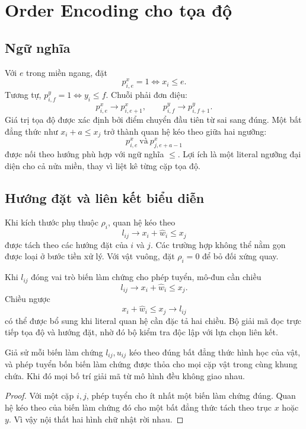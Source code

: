 \section{Order Encoding cho tọa độ}

\subsection{Ngữ nghĩa}

Với \(e\) trong miền ngang, đặt
\[
  p^x_{i,e}=1 \iff x_i\le e.
\]
Tương tự, \(p^y_{i,f}=1\iff y_i\le f\). Chuỗi phải đơn điệu:
\[
  p^x_{i,e}\rightarrow p^x_{i,e+1},
  \qquad
  p^y_{i,f}\rightarrow p^y_{i,f+1}.
\]
Giá trị tọa độ được xác định bởi điểm chuyển đầu tiên từ sai sang đúng. Một
bất đẳng thức như \(x_i+a\le x_j\) trở thành quan hệ kéo theo giữa hai ngưỡng:
\[
  p^x_{i,e}\ \text{và}\ p^x_{j,e+a-1}
\]
được nối theo hướng phù hợp với ngữ nghĩa \(\le\). Lợi ích là một literal
ngưỡng đại diện cho cả nửa miền, thay vì liệt kê từng cặp tọa độ.

\subsection{Hướng đặt và liên kết biểu diễn}

Khi kích thước phụ thuộc \(\rho_i\), quan hệ kéo theo
\[
  l_{ij}\rightarrow x_i+\widehat w_i\le x_j
\]
được tách theo các hướng đặt của \(i\) và \(j\). Các trường hợp không thể nằm
gọn được loại ở bước tiền xử lý. Với vật vuông, đặt
\(\rho_i=0\) để bỏ đối xứng quay.

Khi \(l_{ij}\) đóng vai trò biến làm chứng cho phép tuyển, mô-đun cần chiều
\[
  l_{ij}\rightarrow x_i+\widehat w_i\le x_j.
\]
Chiều ngược
\[
  x_i+\widehat w_i\le x_j\rightarrow l_{ij}
\]
có thể được bổ sung khi literal quan hệ cần đặc tả hai chiều. Bộ giải mã đọc
trực tiếp tọa độ và hướng đặt, nhờ đó bộ kiểm tra độc lập với lựa chọn liên kết.

\begin{proposition}
Giả sử mỗi biến làm chứng \(l_{ij},u_{ij}\) kéo theo đúng bất đẳng thức hình học
của vật, và phép tuyển bốn biến làm chứng được thỏa cho mọi cặp vật trong cùng khung
chứa. Khi đó mọi bố trí giải mã từ mô hình \SAT đều không giao nhau.
\end{proposition}

\begin{proof}
Với một cặp \(i,j\), phép tuyển cho ít nhất một biến làm chứng đúng. Quan hệ kéo
theo của biến làm chứng đó cho một bất đẳng thức tách theo trục \(x\) hoặc \(y\). Vì vậy nội
thất hai hình chữ nhật rời nhau.
\end{proof}


